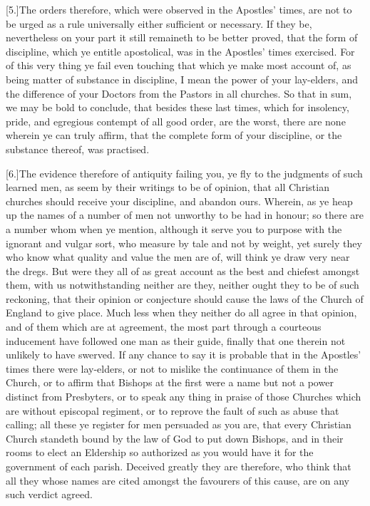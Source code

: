 [5.]The orders therefore, which were observed in the Apostles’ times, are not to be urged as a rule universally either sufficient or necessary. If they be, nevertheless on your part it still remaineth to be better proved, that the form of discipline, which ye entitle apostolical, was in the Apostles’ times exercised. For of this very thing ye fail even touching that which ye make most account of, as being matter of substance in discipline, I mean the power of your lay-elders, and the difference of your Doctors from the Pastors in all churches. So that in sum, we may be bold to conclude, that besides these last times, which for insolency, pride, and egregious contempt of all good order, are the worst, there are none wherein ye can truly affirm, that the complete form of your discipline, or the substance thereof, was practised.

[6.]The evidence therefore of antiquity failing you, ye fly to the judgments of such learned men, as seem by their writings to be of opinion, that all Christian churches should receive your discipline, and abandon ours. Wherein, as ye heap up the names of a number of men not unworthy to be had in honour; so there are a number whom when ye mention, although it serve you to purpose with the ignorant and vulgar sort, who measure by tale and not by weight, yet surely they who know what quality and value the men are of, will think ye draw very near the dregs. But were they all of as great account as the best and chiefest amongst them, with us notwithstanding neither are they, neither ought  they to be of such reckoning, that their opinion or conjecture should cause the laws of the Church of England to give place. Much less when they neither do all agree in that opinion, and of them which are at agreement, the most part through a courteous inducement have followed one man as their guide, finally that one therein not unlikely to have swerved. If any chance to say it is probable that in the Apostles’ times there were lay-elders, or not to mislike the continuance of them in the Church, or to affirm that Bishops at the first were a name but not a power distinct from Presbyters, or to speak any thing in praise of those Churches which are without episcopal regiment, or to reprove the fault of such as abuse that calling; all these ye register for men persuaded as you are, that every Christian Church standeth bound by the law of God to put down Bishops, and in their rooms to elect an Eldership so authorized as you would have it for the government of each parish. Deceived greatly they are therefore, who think that all they whose names are cited amongst the favourers of this cause, are on any such verdict agreed.

